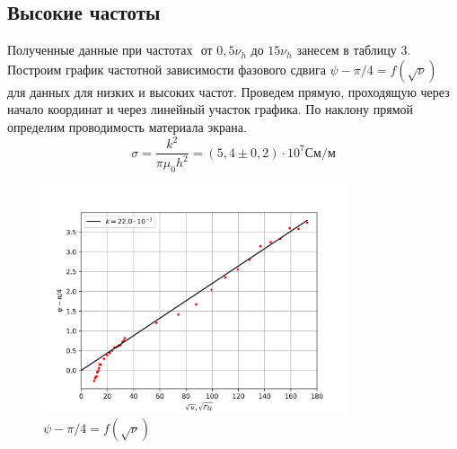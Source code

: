 \documentclass[a4paper, 12pt]{article}
\begin{document}
\subsection*{Высокие частоты}
Полученные данные при частотах $ \text{ от } 0,5\nu_h \text{ до } 15\nu_h$ занесем в таблицу 3. 
Построим график частотной зависимости фазового сдвига $\psi - \pi/4 = f(\sqrt{\nu})$ для данных для низких и высоких частот. Проведем прямую, проходящую через начало координат и через линейный участок графика. По наклону прямой определим проводимость материала экрана.
\begin{equation}
	\sigma = \frac{k^2}{\pi \mu_0 h^2} = (5,4 \pm 0,2)\cdot 10^7 \text{См/м}
\end{equation}
\begin{figure}[H]
    \centering
    \includegraphics[width=0.8\textwidth]{psinu}
    \caption{$\psi - \pi/4 = f(\sqrt{\nu})$}
    \label{fig:psinu}
\end{figure}
\end{document}
